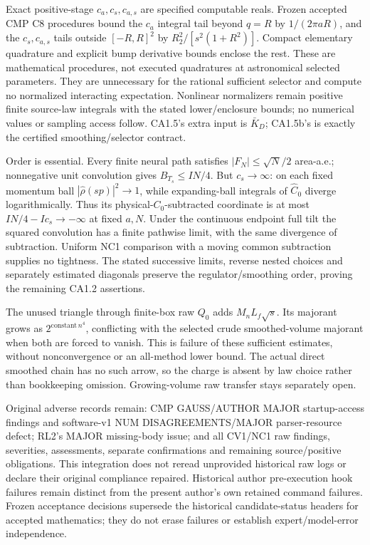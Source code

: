 Exact positive-stage $c_a,c_s,c_{a,s}$ are specified computable reals.
Frozen accepted CMP C8 procedures bound the $c_a$ integral tail beyond
$q=R$ by $1/(2\pi aR)$, and the $c_s,c_{a,s}$ tails outside $[-R,R]^2$
by $R_2^2/[s^2(1+R^2)]$. Compact elementary quadrature and explicit bump
derivative bounds enclose the rest. These are mathematical procedures,
not executed quadratures at astronomical selected parameters. They are
unnecessary for the rational sufficient selector and compute no normalized
interacting expectation. Nonlinear normalizers remain positive finite
source-law integrals with the stated lower/enclosure bounds; no numerical
values or sampling access follow. CA1.5's extra input is $\bar K_D$;
CA1.5b's is exactly the certified smoothing/selector contract.

Order is essential. Every finite neural path satisfies
$|F_N|\le\sqrt N/2$ area-a.e.; nonnegative unit convolution gives
$B_{T_s}\le IN/4$. But $c_s\to\infty$: on each fixed momentum ball
$|\hat\rho(sp)|^2\to1$, while expanding-ball integrals of $\hat C_0$
diverge logarithmically. Thus its physical-$C_0$-subtracted coordinate
is at most $IN/4-Ic_s\to-\infty$ at fixed $a,N$. Under the continuous
endpoint full tilt the squared convolution has a finite pathwise limit,
with the same divergence of subtraction. Uniform NC1 comparison with a
moving common subtraction supplies no tightness. The stated successive
limits, reverse nested choices and separately estimated diagonals preserve
the regulator/smoothing order, proving the remaining CA1.2 assertions.

The unused triangle through finite-box raw $Q_0$ adds $M_nL_f\sqrt s$.
Its majorant grows as $2^{\mathrm{constant}\,n^4}$, conflicting with the
selected crude smoothed-volume majorant when both are forced to vanish.
This is failure of these sufficient estimates, without nonconvergence
or an all-method lower bound. The actual direct smoothed chain has no
such arrow, so the charge is absent by law choice rather than bookkeeping
omission. Growing-volume raw transfer stays separately open.

Original adverse records remain: CMP GAUSS/AUTHOR MAJOR startup-access
findings and software-v1 NUM DISAGREEMENTS/MAJOR parser-resource defect;
RL2's MAJOR missing-body issue; and all CV1/NC1 raw findings, severities,
assessments, separate confirmations and remaining source/positive
obligations. This integration does not reread unprovided historical raw
logs or declare their original compliance repaired. Historical author
pre-execution hook failures remain distinct from the present author's
own retained command failures. Frozen acceptance decisions supersede
the historical candidate-status headers for accepted mathematics; they
do not erase failures or establish expert/model-error independence.

